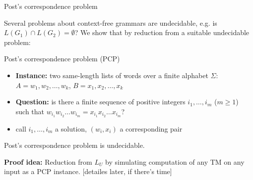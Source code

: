 \documentclass[handout]{beamer}
\begin{document}
\begin{frame}{Post's correspondence problem}

    \vspace{-4pt}
    Several problems about context-free grammars are undecidable, e.g. is $L(G_1)\cap L(G_2)=\emptyset$? We show that by reduction from a suitable undecidable problem:
    
    \begin{block}{Post's correspondence problem (PCP)}
        \begin{itemize}
            \item \textbf{Instance:} two same-length lists of words over a finite alphabet $\Sigma$: \alert{$A=w_1,w_2,\ldots, w_k$}, \alert{$B=x_1,x_2,\ldots, x_k$}
            \item \textbf{Question:} is there a finite sequence of positive integers $i_1,\dots,i_m$ ($m\geq 1$) such that \alert{$w_{i_1} w_{i_2} \ldots w_{i_m}=x_{i_1} x_{i_2} \ldots x_{i_m}$}?
            \item call $i_1,\dots,i_m$ a \alert{solution}, $(w_i,x_i)$ a \alert{corresponding} pair
        \end{itemize}
    \end{block}
   

    \begin{theorem}
        Post's correspondence problem is undecidable.
    \end{theorem}
    \vspace{-8pt}
    \textbf{Proof idea:} Reduction from $L_U$ by simulating computation of any TM on any input as a PCP instance. [detailes later, if there's time]

\end{frame}
\end{document}
